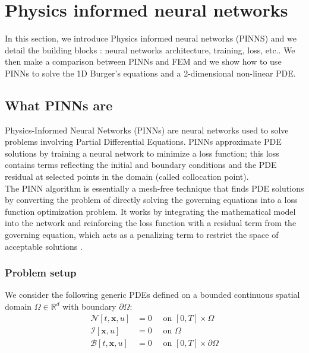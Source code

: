 \documentclass[12pt,openany]{amsbook}
\newcommand{\bbm}[1]{{\mathbf{#1}}}
\begin{document}
\chapter{Physics informed neural networks}

In this section, we introduce Physics informed neural networks (PINNS) \cite{raissi2017physicsI} and we detail the building blocks :
neural networks architecture, training, 
loss, etc.. We then make a comparison between PINNs and FEM and we show how to use PINNs to solve the 1D Burger's equations 
and a 2-dimensional non-linear PDE.

\section{What PINNs are}

Physics-Informed Neural Networks (PINNs) are neural networks used to solve problems involving Partial Differential Equations.
PINNs approximate PDE solutions by training a neural network to minimize a loss function; this loss contains terms 
reflecting the initial and boundary conditions and the PDE residual at selected points in the domain (called collocation point).\\

The PINN algorithm is essentially a mesh-free technique that finds PDE solutions by converting the problem of directly solving the governing equations into
a loss function optimization problem. It works by integrating the mathematical 
model into the network and reinforcing the loss function with a residual
term from the governing equation, which acts as a penalizing term to restrict
the space of acceptable solutions \cite{https://doi.org/10.48550/arxiv.2201.05624}.

\subsection{Problem setup}

We consider the following generic PDEs defined on a bounded continuous spatial domain $\Omega\in\mathbb{R}^d$ with boundary $\partial \Omega$:
\begin{align*}
\mathcal{N}[t,\bbm x, u] &= 0 \quad \text{ on } [0,T]\times\Omega\\
\mathcal{I}[\bbm x, u] &= 0 \quad \text{ on } \Omega\\
\mathcal{B}[t,\bbm x, u] &= 0 \quad \text{ on } [0,T]\times \partial\Omega
\tag{1}
\label{pde:1}
\end{align*} 
\end{document}
